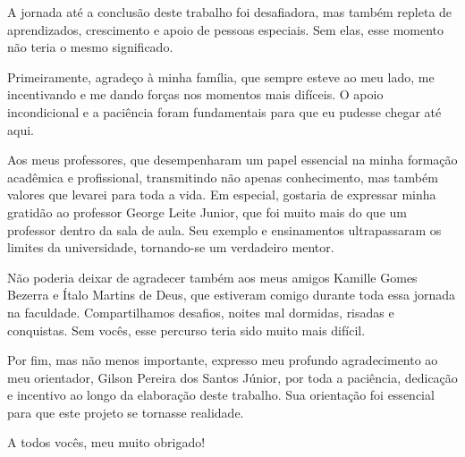 \documentclass[
	12pt,				%
	oneside,			%
	a4paper,			%
	english,			%
	french,				%
	spanish,			%
	brazil				%
	]{abntex2}
\begin{document}
\begin{agradecimentos}

A jornada até a conclusão deste trabalho foi desafiadora, mas também
repleta de aprendizados, crescimento e apoio de pessoas especiais. Sem
elas, esse momento não teria o mesmo significado.

Primeiramente, agradeço à minha família, que sempre esteve ao meu lado,
me incentivando e me dando forças nos momentos mais difíceis. O apoio
incondicional e a paciência foram fundamentais para que eu pudesse
chegar até aqui.

Aos meus professores, que desempenharam um papel essencial na minha
formação acadêmica e profissional, transmitindo não apenas conhecimento,
mas também valores que levarei para toda a vida. Em especial, gostaria
de expressar minha gratidão ao professor George Leite Junior, que foi
muito mais do que um professor dentro da sala de aula. Seu exemplo e
ensinamentos ultrapassaram os limites da universidade, tornando-se um
verdadeiro mentor.

Não poderia deixar de agradecer também aos meus amigos Kamille Gomes
Bezerra e Ítalo Martins de Deus, que estiveram comigo durante toda essa
jornada na faculdade. Compartilhamos desafios, noites mal dormidas,
risadas e conquistas. Sem vocês, esse percurso teria sido muito mais
difícil.

Por fim, mas não menos importante, expresso meu profundo agradecimento
ao meu orientador, Gilson Pereira dos Santos Júnior, por toda a
paciência, dedicação e incentivo ao longo da elaboração deste trabalho.
Sua orientação foi essencial para que este projeto se tornasse
realidade.

A todos vocês, meu muito obrigado!

\end{agradecimentos}

\end{document}

